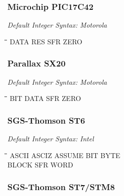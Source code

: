\subsubsection{Microchip PIC17C42}

{\em Default Integer Syntax: Motorola}

{\tt\begin{tabbing}
\hspace{3cm}\=\hspace{3cm}\=\hspace{3cm}\=\hspace{3cm}\=\kill
DATA       \> RES         \> SFR         \> ZERO \\
\end{tabbing}}

\subsubsection{Parallax SX20}

{\em Default Integer Syntax: Motorola}

{\tt\begin{tabbing}
\hspace{3cm}\=\hspace{3cm}\=\hspace{3cm}\=\hspace{3cm}\=\kill
BIT        \> DATA        \> SFR         \> ZERO \\
\end{tabbing}}

\subsubsection{SGS-Thomson ST6}

{\em Default Integer Syntax: Intel}

{\tt\begin{tabbing}
\hspace{3cm}\=\hspace{3cm}\=\hspace{3cm}\=\hspace{3cm}\=\kill
ASCII      \> ASCIZ       \> ASSUME      \> BIT  \>  BYTE \\
BLOCK      \> SFR         \> WORD \\
\end{tabbing}}

\subsubsection{SGS-Thomson ST7/STM8}

